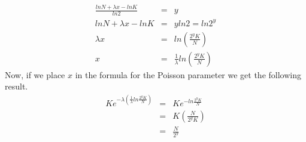 \documentclass[a4paper, 10pt]{article}
\begin{document}
\begin{enumerate}[(i)]
        \begin{eqnarray}
          \frac{ln N + \lambda x - ln K}{ln 2} &=& y              \nonumber \\
          ln N + \lambda x - ln K &=& y ln 2 = ln 2^y             \nonumber \\
          \lambda x &=& ln \left( \frac{2^y K}{N} \right)         \nonumber \\
          x &=& \frac{1}{\lambda}ln\left( \frac{2^y K}{N} \right) \nonumber
        \end{eqnarray}
        Now, if we place $x$ in the formula for the Poisson parameter we get the following result.
        \begin{eqnarray}
          K e^{-\lambda\left( \frac{1}{\lambda}ln\frac{2^y K}{N} \right)} &=& K e^{-ln\frac{2^y K}{N}}         \nonumber \\
                                                                          &=& K \left( \frac{N}{2^y K} \right) \nonumber \\
                                                                          &=& \frac{N}{2^y}                    \nonumber
        \end{eqnarray}
\end{enumerate}
\end{document}

